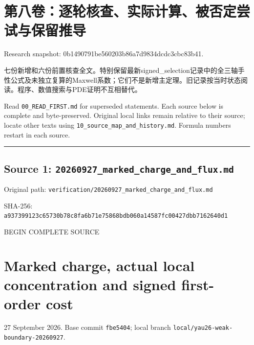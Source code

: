 \documentclass[
  10pt,
]{article}
\author{}
\date{}
\begin{document}
\hypertarget{ux7b2cux516bux5377ux9010ux8f6eux6838ux67e5ux5b9eux9645ux8ba1ux7b97ux88abux5426ux5b9aux5c1dux8bd5ux4e0eux4fddux7559ux63a8ux5bfc}{%
\section{第八卷：逐轮核查、实际计算、被否定尝试与保留推导}\label{ux7b2cux516bux5377ux9010ux8f6eux6838ux67e5ux5b9eux9645ux8ba1ux7b97ux88abux5426ux5b9aux5c1dux8bd5ux4e0eux4fddux7559ux63a8ux5bfc}}

Research snapshot: 0b1490791be560203b86a7d9834dcdc3cbc83b41.

七份新增和六份前置核查全文。特别保留最新signed\_selection记录中的全三轴手性公式及未独立复算的Maxwell系数；它们不是新增主定理。旧记录按当时状态阅读。程序、数值搜索与PDE证明不互相替代。

Read \nolinkurl{00_READ_FIRST.md} for superseded statements. Each source below is
complete and byte-preserved. Original local links remain relative to
their source; locate other texts using \nolinkurl{10_source_map_and_history.md}.
Formula numbers restart in each source.

\begin{center}\rule{0.5\linewidth}{0.5pt}\end{center}

\hypertarget{source-1-20260927_marked_charge_and_flux.md}{%
\subsection{Source 1:
\nolinkurl{20260927_marked_charge_and_flux.md}}\label{source-1-20260927_marked_charge_and_flux.md}}

Original path:
\nolinkurl{verification/20260927_marked_charge_and_flux.md}

SHA-256:
\nolinkurl{a937399123c65730b78c8fa6b71e75868bdb060a14587fc00427dbb7162640d1}

BEGIN COMPLETE SOURCE

\hypertarget{marked-charge-actual-local-concentration-and-signed-first-order-cost}{%
\section{Marked charge, actual local concentration and signed
first-order
cost}\label{marked-charge-actual-local-concentration-and-signed-first-order-cost}}

27 September 2026. Base commit \texttt{fbe5404}; local branch
\nolinkurl{local/yau26-weak-boundary-20260927}.
\end{document}
